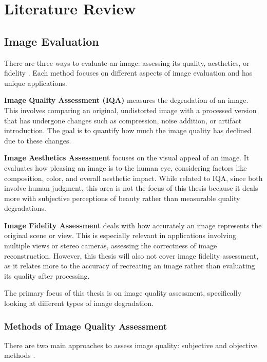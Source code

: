 \chapter{Literature Review}
\label{ch:LiteratureReview}

\section{Image Evaluation}
\label{sec:ImageEvaluation}
There are three ways to evaluate an image: assessing its quality, aesthetics, or fidelity \autocite{D}. Each method focuses on different aspects of image evaluation and has unique applications. \par
\vspace{\baselineskip}
\noindent
\textbf{Image Quality Assessment (IQA)} measures the degradation of an image. This involves comparing an original, undistorted image with a processed version that has undergone changes such as compression, noise addition, or artifact introduction. The goal is to quantify how much the image quality has declined due to these changes.\par
\vspace{\baselineskip}
\noindent
\textbf{Image Aesthetics Assessment} focuses on the visual appeal of an image. It evaluates how pleasing an image is to the human eye, considering factors like composition, color, and overall aesthetic impact. While related to IQA, since both involve human judgment, this area is not the focus of this thesis because it deals more with subjective perceptions of beauty rather than measurable quality degradations. \par
\vspace{\baselineskip}
\noindent
\textbf{Image Fidelity Assessment} deals with how accurately an image represents the original scene or view. This is especially relevant in applications involving multiple views or stereo cameras, assessing the correctness of image reconstruction. However, this thesis will also not cover image fidelity assessment, as it relates more to the accuracy of recreating an image rather than evaluating its quality after processing. \par
\vspace{\baselineskip}
\noindent
The primary focus of this thesis is on image quality assessment, specifically looking at different types of image degradation. \par
\clearpage
\subsection{Methods of Image Quality Assessment}
\label{sub:MethodsImageQualityAssessment}
There are two main approaches to assess image quality: subjective and objective methods \autocite{D}. \par
